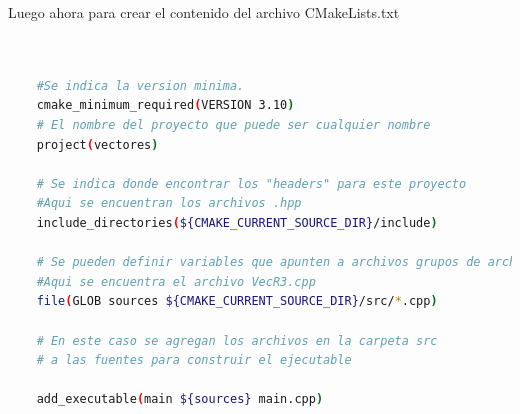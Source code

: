\documentclass[11pt]{article}
\begin{document}
	Luego ahora para crear el contenido del archivo CMakeLists.txt
	
	
	\begin{lstlisting}[language=bash]
		
	
	#Se indica la version minima.
	cmake_minimum_required(VERSION 3.10)
	# El nombre del proyecto que puede ser cualquier nombre
	project(vectores)
	
	# Se indica donde encontrar los "headers" para este proyecto
	#Aqui se encuentran los archivos .hpp
	include_directories(${CMAKE_CURRENT_SOURCE_DIR}/include)
	
	# Se pueden definir variables que apunten a archivos grupos de archivos
	#Aqui se encuentra el archivo VecR3.cpp
	file(GLOB sources ${CMAKE_CURRENT_SOURCE_DIR}/src/*.cpp)
	
	# En este caso se agregan los archivos en la carpeta src
	# a las fuentes para construir el ejecutable
	
	add_executable(main ${sources} main.cpp)
	
	\end{lstlisting}
	
	
	
	
	
	
	
	\vspace{0.1 in}
	
\end{document}
